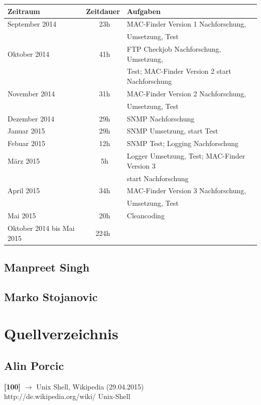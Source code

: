 \documentclass[12pt,a4paper]{report}
\begin{document}
\begin{onehalfspace}
\begin{tabular}{|l|c|l|}
\hline
\textbf{Zeitraum} & \textbf{Zeitdauer} & \textbf{Aufgaben} \\ \hline \hline
September 2014 & ~23h & MAC-Finder Version 1 Nachforschung, \\&& Umsetzung, Test\\ \hline
Oktober 2014 & ~41h & FTP Checkjob Nachforschung, Umsetzung,\\&& Test; MAC-Finder Version 2 start Nachforschung\\ \hline
November 2014 & ~31h & MAC-Finder Version 2 Nachforschung,\\&& Umsetzung, Test\\ \hline
Dezember 2014 & ~29h & SNMP Nachforschung\\ \hline
Januar 2015 & ~29h & SNMP Umsetzung, start Test\\ \hline
Febuar 2015 & ~12h & SNMP Test; Logging Nachforschung\\ \hline
März 2015 & ~5h & Logger Umsetzung, Test; MAC-Finder Version 3\\&& start Nachforschung\\ \hline
April 2015 & ~34h & MAC-Finder Version 3 Nachforschung,\\&& Umsetzung, Test\\ \hline
Mai 2015 & ~20h & Cleancoding\\
\hline \hline
Oktober 2014 bis Mai 2015 & 224h &\\ \hline
\end{tabular}

\chapter{Manpreet Singh}

\chapter{Marko Stojanovic}

\part{Quellverzeichnis}

\chapter{Alin Porcic}

\noindent
\textbf{[100]} $\rightarrow$ Unix Shell, Wikipedia (29.04.2015)\\
http://de.wikipedia.org/wiki/ Unix-Shell\\


\end{onehalfspace}
\end{document}
